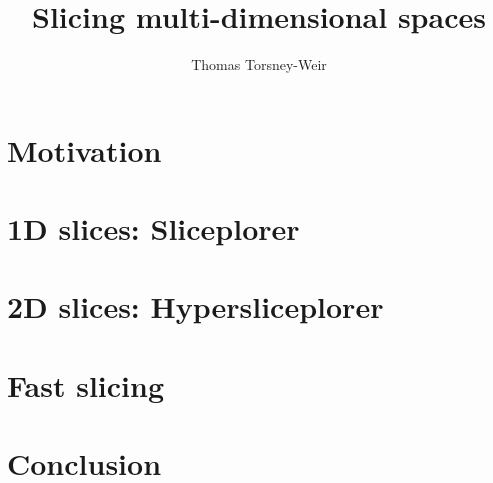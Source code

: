 \documentclass[a4paper,12pt]{article}
\title{Slicing multi-dimensional spaces}
\author{Thomas Torsney-Weir}
\date{}
\begin{document}

\nobibliography*

\maketitle


\section{Motivation}

\section{1D slices: Sliceplorer}

\section{2D slices: Hypersliceplorer}

\section{Fast slicing}

\section{Conclusion}




\end{document}
